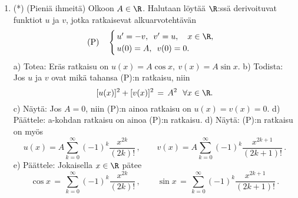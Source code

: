 \begin{enumerate}
\item (*) \label{H-exp-2: kosini ja sini} 
(Pieniä ihmeitä) Olkoon $A\in\R$. Halutaan löytää $\R$:ssä derivoituvat funktiot $u$ ja $v$,
jotka ratkaisevat alkuarvotehtävän
\[
\text{(P)} \quad \begin{cases} 
                 \,u'=-v,\,\ v'=u, \quad x\in\R, \\ \,u(0)=A,\,\ v(0)=0. 
                 \end{cases}
\]
a) Totea: Eräs ratkaisu on $u(x)=A\cos x,\ v(x)=A\sin x$. \newline
b) Todista: Jos $u$ ja $v$ ovat mikä tahansa (P):n ratkaisu, niin
\[
[u(x)]^2+[v(x)]^2\,=\,A^2\ \ \forall x\in\R.
\]
c) Näytä: Jos $A=0$, niin (P):n ainoa ratkaisu on $u(x)=v(x)=0$. \newline
d) Päättele: a-kohdan ratkaisu on ainoa (P):n ratkaisu. \newline
d) Näytä: (P):n ratkaisu on myös
\[
u(x)=A\sum_{k=0}^\infty (-1)^k\frac{x^{2k}}{(2k)!}\,, \qquad
v(x)=A\sum_{k=0}^\infty (-1)^k\frac{x^{2k+1}}{(2k+1)!}\,.
\]
e) Päättele: Jokaisella $x\in\R$ pätee
\[
\cos x\,=\,\sum_{k=0}^\infty (-1)^k\frac{x^{2k}}{(2k)!}\,, \qquad
\sin x\,=\,\sum_{k=0}^\infty (-1)^k\frac{x^{2k+1}}{(2k+1)!}\,.
\]

\end{enumerate}